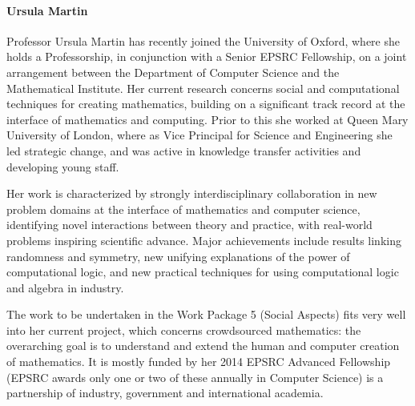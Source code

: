 \paragraph{Ursula Martin}

%

%


Professor Ursula Martin has  recently joined the University of Oxford, where
she holds a Professorship, in conjunction with a Senior EPSRC Fellowship, on a
joint arrangement between  the Department of Computer Science and the
Mathematical Institute. Her current  research concerns social and computational
techniques for creating mathematics, building on a significant track record at
the interface of mathematics and computing. Prior to this she worked at  Queen
Mary University of London, where as Vice Principal for Science and Engineering
she led strategic change, and was active in knowledge transfer
activities and developing young staff. 

Her work is characterized by strongly interdisciplinary collaboration in new
problem domains at the interface of mathematics and computer science,
identifying novel interactions between theory and practice, with real-world
problems inspiring scientific advance. Major achievements include results
linking randomness and symmetry, new unifying explanations of the power of
computational logic, and new practical techniques for using computational logic
and algebra in industry.

The work to be undertaken in the Work Package 5 (Social Aspects) fits very well
into her current project, which concerns crowdsourced mathematics: the overarching goal is
to understand and extend the human and computer creation of mathematics. 
It is mostly funded by her
2014 EPSRC Advanced Fellowship (EPSRC awards only one or two of these annually
in Computer Science) is a partnership of industry, government and international
academia.  
